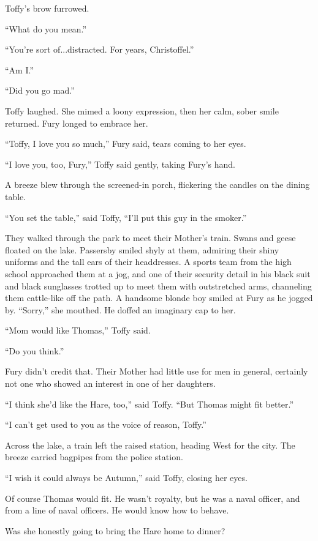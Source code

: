 \documentclass[11pt,a5paper]{article}
\begin{document}
Toffy's brow furrowed.

``What do you mean.''

``You're sort of...distracted. For years, Christoffel.''

``Am I.''

``Did you go mad.''

Toffy laughed. She mimed a loony expression, then her calm, sober smile returned. Fury longed to embrace her.

``Toffy, I love you so much,'' Fury said, tears coming to her eyes.

``I love you, too, Fury,'' Toffy said gently, taking Fury's hand.

A breeze blew through the screened-in porch, flickering the candles on the dining table.

``You set the table,'' said Toffy, ``I'll put this guy in the smoker.''



They walked through the park to meet their Mother's train. Swans and geese floated on the lake. Passersby smiled shyly at them, admiring their shiny uniforms and the tall ears of their headdresses. A sports team from the high school approached them at a jog, and one of their security detail in his black suit and black sunglasses trotted up to meet them with outstretched arms, channeling them cattle-like off the path. A handsome blonde boy smiled at Fury as he jogged by. ``Sorry,'' she mouthed. He doffed an imaginary cap to her.

``Mom would like Thomas,'' Toffy said.

``Do you think.''

Fury didn't credit that. Their Mother had little use for men in general, certainly not one who showed an interest in one of her daughters.

``I think she'd like the Hare, too,'' said Toffy. ``But Thomas might fit better.''

``I can't get used to you as the voice of reason, Toffy.''

Across the lake, a train left the raised station, heading West for the city. The breeze carried bagpipes from the police station.

``I wish it could always be Autumn,'' said Toffy, closing her eyes.

Of course Thomas would fit. He wasn't royalty, but he was a naval officer, and from a line of naval officers. He would know how to behave.

Was she honestly going to bring the Hare home to dinner?
\end{document}
